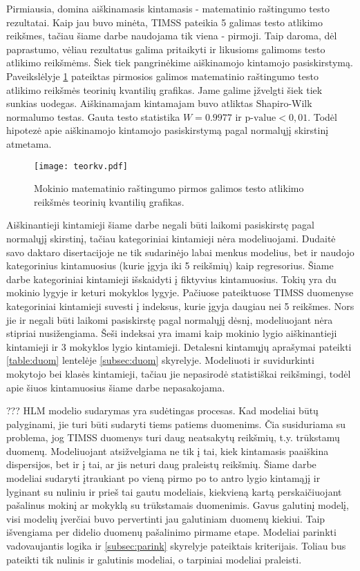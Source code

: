 \documentclass[11pt,a4paper]{article}
\begin{document}
\indent Pirmiausia, domina aiškinamasis kintamasis - matematinio raštingumo testo rezultatai. Kaip jau buvo minėta, TIMSS pateikia 5 galimas testo atlikimo reikšmes, tačiau šiame darbe naudojama tik viena - pirmoji. Taip daroma, dėl paprastumo, vėliau rezultatus galima pritaikyti ir likusioms galimoms testo atlikimo reikšmėms. 
Šiek tiek pangrinėkime aiškinamojo kintamojo pasiskirstymą. Paveikslėlyje \ref{fig:y} pateiktas pirmosios galimos matematinio raštingumo testo atlikimo reikšmės teorinių kvantilių grafikas. Jame galime įžvelgti šiek tiek sunkias uodegas. Aiškinamajam kintamajam buvo atliktas Shapiro-Wilk normalumo testas. Gauta testo statistika $W = 0.9977$ ir $\text{p-value}<0,01$. Todėl hipotezė apie aiškinamojo kintamojo pasiskirstymą pagal normalųjį skirstinį atmetama.

\begin{figure}[H]
\centering
\texttt{[image: teorkv.pdf]}
\caption{Mokinio matematinio raštingumo pirmos galimos testo atlikimo reikšmės teorinių kvantilių grafikas.}
\label{fig:y}
\end{figure}

\indent Aiškinantieji kintamieji šiame darbe negali būti laikomi pasiskirstę pagal normalųjį skirstinį, tačiau kategoriniai kintamieji nėra modeliuojami. Dudaitė savo daktaro disertacijoje \cite{liet2003} ne tik sudarinėjo labai menkus modelius, bet ir naudojo kategorinius kintamuosius (kurie įgyja iki 5 reikšmių) kaip regresorius. Šiame darbe kategoriniai kintamieji išskaidyti į fiktyvius kintamuosius. Tokių yra du mokinio lygyje ir keturi mokyklos lygyje. Pačiuose pateiktuose TIMSS duomenyse kategoriniai kintamieji suvesti į indeksus, kurie įgyja daugiau nei 5 reikšmes. Nors jie ir negali būti laikomi pasiskirstę pagal normalųjį dėsnį, modeliuojant nėra stipriai nusižengiama. Šeši indeksai yra imami kaip mokinio lygio aiškinantieji kintamieji ir 3 mokyklos lygio kintamieji. Detalesni kintamųjų aprašymai pateikti \ref{table:duom} lentelėje \ref{subsec:duom} skyrelyje. Modeliuoti ir suvidurkinti mokytojo bei klasės kintamieji, tačiau jie nepasirodė statistiškai reikšmingi, todėl apie šiuos kintamuosius šiame darbe nepasakojama.

\indent ??? HLM modelio sudarymas yra sudėtingas procesas. Kad modeliai būtų palyginami, jie turi būti sudaryti tiems patiems duomenims. Čia susiduriama su problema, jog TIMSS duomenys turi daug neatsakytų reikšmių, t.y. trūkstamų duomenų. Modeliuojant atsižvelgiama ne tik į tai, kiek kintamasis paaiškina dispersijos, bet ir į tai, ar jis neturi daug praleistų reikšmių. Šiame darbe modeliai sudaryti įtraukiant po vieną pirmo po to antro lygio kintamąjį ir lyginant su nuliniu ir prieš tai gautu modeliais, kiekvieną kartą perskaičiuojant pašalinus mokinį ar mokyklą su trūkstamais duomenimis. Gavus galutinį modelį, visi modelių įverčiai buvo pervertinti jau galutiniam duomenų kiekiui. Taip išvengiama per didelio duomenų pašalinimo pirmame etape. Modeliai parinkti vadovaujantis logika ir \ref{subsec:parink} skyrelyje pateiktais kriterijais. Toliau bus pateikti tik nulinis ir galutinis modeliai, o tarpiniai modeliai praleisti.
\end{document}

